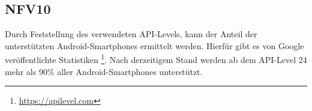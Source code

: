\subsection*{NFV10}

Durch Feststellung des verwendeten API-Levels, kann der Anteil der unterstützten Android-Smartphones ermittelt werden.
Hierfür gibt es von Google veröffentlichte Statistiken \footnote{\href{https://apilevel.com}{https://apilevel.com}}.
Nach derzeitigem Stand werden ab dem API-Level 24 mehr als 90\% aller Android-Smartphones unterstützt.